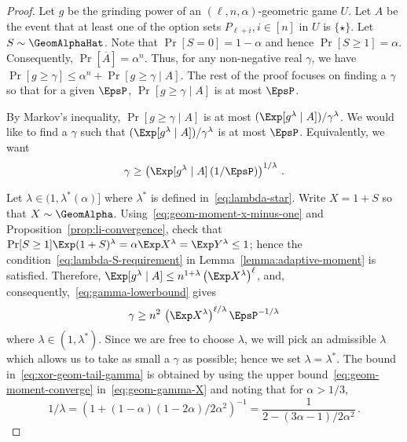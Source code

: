 \begin{proof}
    Let $g$ be the grinding power of an $(\ell, n, \alpha)$-geometric game $U$.
    Let $A$ be the event that 
    at least one of the option sets $P_{\ell + i}, i \in [n]$ in $U$ is $\{\star\}$. 
    Let $S \sim \GeomAlphaHat$. 
    Note that $\Pr[S = 0] = 1 - \alpha$ and hence $\Pr[S \geq 1] = \alpha$. 
    Consequently, $\Pr[\overline{A}] = \alpha^n$. 
    Thus, for any non-negative real $\gamma$, 
    we have $\Pr[g \geq \gamma] \leq \alpha^n + \Pr[g \geq \gamma \mid A]$. 
    The rest of the proof focuses on finding a $\gamma$ so that 
    for a given $\EpsP$, 
    $\Pr[g \geq \gamma \mid A]$ is at most $\EpsP$.

    By Markov's inequality, 
    $\Pr[g \geq \gamma \mid A]$ is at most $(\Exp [g^\lambda \mid A])/\gamma^\lambda$.
    We would like to find a $\gamma$ such that 
    $(\Exp [g^\lambda \mid A])/\gamma^\lambda$ is at most $\EpsP$. 
    Equivalently, we want 
    \begin{equation}\label{eq:gamma-lowerbound}
        \gamma \geq 
        \left( \Exp[g^\lambda \mid A]\,(1/\EpsP) \right)^{1/\lambda}
        \,.         
    \end{equation}

    Let $\lambda \in (1, \lambda^*(\alpha)]$ 
    where $\lambda^*$ is defined in~\eqref{eq:lambda-star}. 
    Write $X = 1 + S$ 
    so that $X \sim \GeomAlpha$. 
    Using~\eqref{eq:geom-moment-x-minus-one} and Proposition~\ref{prop:li-convergence}, 
    check that $\Pr[S \geq 1] \Exp (1 + S)^\lambda = \alpha \Exp X^\lambda = \Exp Y^\lambda \leq 1$; 
    hence 
    the condition~\eqref{eq:lambda-S-requirement} 
    in Lemma~\ref{lemma:adaptive-moment} is satisfied. 
    Therefore, 
    $
           \Exp[g^\lambda \mid A] \leq 
            n^{1+\lambda} 
            \left(\Exp X^\lambda\right)^{\ell}
    $,
    and, consequently,~\eqref{eq:gamma-lowerbound} gives 
    \begin{equation}\label{eq:geom-gamma-X}
        \gamma 
        \geq n^2 \,
            \left(\Exp X^\lambda\right)^{\ell/\lambda} \EpsP^{-1/\lambda}
    \end{equation}  
    where $\lambda \in (1, \lambda^*)$. 
    Since we are free to choose $\lambda$, 
    we will pick an admissible $\lambda$ which 
    allows us to take as small a $\gamma$ as possible; 
    hence we set $\lambda = \lambda^*$. 
    The bound in~\eqref{eq:xor-geom-tail-gamma} is obtained by 
    using the upper bound~\eqref{eq:geom-moment-converge} in~\eqref{eq:geom-gamma-X}
    and noting that for $\alpha > 1/3$, 
    $$
        1/\lambda = (1 + (1- \alpha)(1 - 2 \alpha)/2 \alpha^2)^{-1} 
        = \frac{1}{2 - (3\alpha - 1)/2\alpha^2}
        \,.
    $$   
\end{proof}


